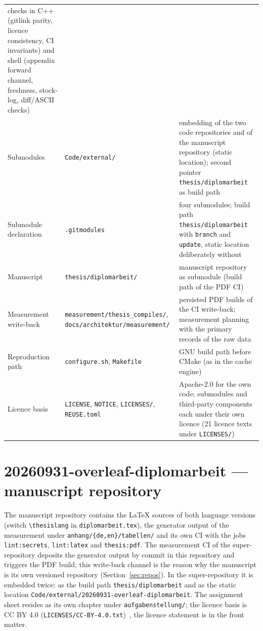 {\begin{longtable}{@{}>{\raggedright\arraybackslash}p{}>{\raggedright\arraybackslash}p{}>{\raggedright\arraybackslash}p{}@{}}
checks in C++ (gitlink parity, licence consistency, CI invariants) and shell (appendix forward channel,
freshness, stock-log, diff/ASCII checks) \\
Submodules &
\texttt{Code/\allowbreak{}external/} &
embedding of the two code repositories and of the manuscript repository (static location); second
pointer \texttt{thesis/\allowbreak{}diplomarbeit} as build path \\
Submodule declaration &
\texttt{.gitmodules} &
four submodules; build path \texttt{thesis/\allowbreak{}diplomarbeit} with \texttt{branch} and \texttt{update},
static location deliberately without \\
Manuscript &
\texttt{thesis/\allowbreak{}diplomarbeit/} &
manuscript repository as submodule (build path of the PDF CI) \\
Measurement write-back &
\texttt{measurement/\allowbreak{}thesis\_compiles/}, \texttt{docs/\allowbreak{}architektur/\allowbreak{}measurement/} &
persisted PDF builds of the CI write-back; measurement planning with the primary records of the raw data \\
Reproduction path &
\texttt{configure.sh}, \texttt{Makefile} &
GNU build path before CMake (as in the cache engine) \\
Licence basis &
\texttt{LICENSE}, \texttt{NOTICE}, \texttt{LICENSES/}, \texttt{REUSE.toml} &
Apache-2.0 for the own code; submodules and third-party components each under their own licence (21 licence
texts under \texttt{LICENSES/}) \\
\end{longtable}
}

\section*{20260931-overleaf-diplomarbeit --- manuscript repository}

The manuscript repository contains the LaTeX sources of both language versions (switch
\texttt{\textbackslash{}thesislang} in \texttt{diplomarbeit.tex}), the generator output of the measurement under
\texttt{anhang/\allowbreak{}\{de,en\}/\allowbreak{}tabellen/} and its own CI with the jobs
\texttt{lint:secrets}, \texttt{lint:latex} and \texttt{thesis:pdf}. The measurement CI of the super-repository
deposits the generator output by commit in this repository and triggers the PDF build; this
write-back channel is the reason why the manuscript is its own versioned repository
(Section~\ref{sec:repos}). In the super-repository it is embedded twice: as the build path
\texttt{thesis/\allowbreak{}diplomarbeit} and as the static location
\texttt{Code/\allowbreak{}external/\allowbreak{}20260931-\allowbreak{}overleaf-\allowbreak{}diplomarbeit}. The
assignment sheet resides as its own chapter under \texttt{aufgabenstellung/}; the licence basis is CC BY 4.0
(\texttt{LICENSES/\allowbreak{}CC-BY-4.0.txt})~\cite{cc2013by40}, the licence statement is in the front matter.

